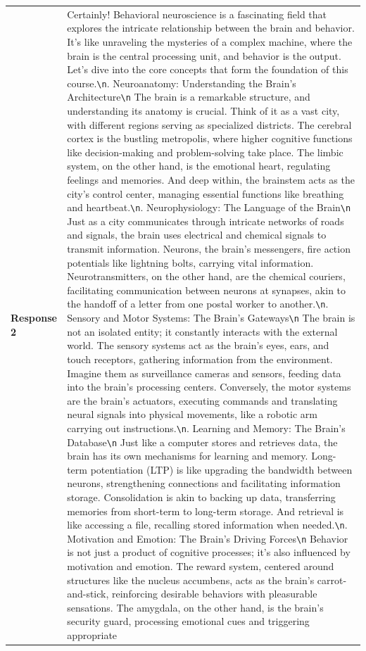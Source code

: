 \documentclass{article} %
\begin{document}
\begin{center}
\begin{longtable}{p{2.8cm}|p{10cm}}
   \textbf{Response 2}   &    Certainly! Behavioral neuroscience is a fascinating field that explores the intricate relationship between the brain and behavior. It's like unraveling the mysteries of a complex machine, where the brain is the central processing unit, and behavior is the output. Let's dive into the core concepts that form the foundation of this course.\verb|\n|\newline 1. Neuroanatomy: Understanding the Brain's Architecture\verb|\n|   The brain is a remarkable structure, and understanding its anatomy is crucial. Think of it as a vast city, with different regions serving as specialized districts. The cerebral cortex is the bustling metropolis, where higher cognitive functions like decision-making and problem-solving take place. The limbic system, on the other hand, is the emotional heart, regulating feelings and memories. And deep within, the brainstem acts as the city's control center, managing essential functions like breathing and heartbeat.\verb|\n|\newline 2. Neurophysiology: The Language of the Brain\verb|\n|   Just as a city communicates through intricate networks of roads and signals, the brain uses electrical and chemical signals to transmit information. Neurons, the brain's messengers, fire action potentials like lightning bolts, carrying vital information. Neurotransmitters, on the other hand, are the chemical couriers, facilitating communication between neurons at synapses, akin to the handoff of a letter from one postal worker to another.\verb|\n|\newline 3. Sensory and Motor Systems: The Brain's Gateways\verb|\n|   The brain is not an isolated entity; it constantly interacts with the external world. The sensory systems act as the brain's eyes, ears, and touch receptors, gathering information from the environment. Imagine them as surveillance cameras and sensors, feeding data into the brain's processing centers. Conversely, the motor systems are the brain's actuators, executing commands and translating neural signals into physical movements, like a robotic arm carrying out instructions.\verb|\n|\newline 4. Learning and Memory: The Brain's Database\verb|\n|   Just like a computer stores and retrieves data, the brain has its own mechanisms for learning and memory. Long-term potentiation (LTP) is like upgrading the bandwidth between neurons, strengthening connections and facilitating information storage. Consolidation is akin to backing up data, transferring memories from short-term to long-term storage. And retrieval is like accessing a file, recalling stored information when needed.\verb|\n|\newline 5. Motivation and Emotion: The Brain's Driving Forces\verb|\n|   Behavior is not just a product of cognitive processes; it's also influenced by motivation and emotion. The reward system, centered around structures like the nucleus accumbens, acts as the brain's carrot-and-stick, reinforcing desirable behaviors with pleasurable sensations. The amygdala, on the other hand, is the brain's security guard, processing emotional cues and triggering appropriate 
\end{longtable}
\end{center}
\end{document}
